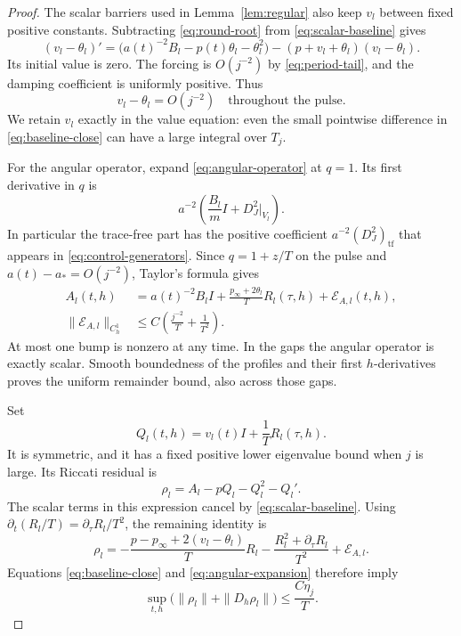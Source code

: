 \begin{proof}
The scalar barriers used in Lemma~\ref{lem:regular} also keep \(v_l\)
between fixed positive constants.  Subtracting
\eqref{eq:round-root} from \eqref{eq:scalar-baseline} gives
\[
 (v_l-\theta_l)'=
 \bigl(a(t)^{-2}B_l-p(t)\theta_l-\theta_l^2\bigr)
 -(p+v_l+\theta_l)(v_l-\theta_l).
\]
Its initial value is zero.  The forcing is \(O(j^{-2})\) by
\eqref{eq:period-tail}, and the damping coefficient is uniformly
positive.  Thus
\begin{equation}
 v_l-\theta_l=O(j^{-2})
 \quad\text{throughout the pulse}.
 \label{eq:baseline-close}
\end{equation}
We retain \(v_l\) exactly in the value equation: even the small
pointwise difference in \eqref{eq:baseline-close} can have a large
integral over \(T_j\).

For the angular operator, expand \eqref{eq:angular-operator} at
\(q=1\).  Its first derivative in \(q\) is
\[
 a^{-2}\left(\frac{B_l}{m}I+D_J^2|_{V_l}\right).
\]
In particular the trace-free part has the positive coefficient
\(a^{-2}(D_J^2)_{\mathrm{tf}}\) that appears in
\eqref{eq:control-generators}.  Since \(q=1+z/T\) on the pulse and
\(a(t)-a_*=O(j^{-2})\), Taylor's formula gives
\begin{equation}
 \begin{aligned}
 A_l(t,h)
 &=a(t)^{-2}B_lI+\frac{p_\infty+2\theta_l}{T}R_l(\tau,h)
       +\mathcal E_{A,l}(t,h),\\
 \|\mathcal E_{A,l}\|_{C^1_h}
 &\leq C\left(\frac{j^{-2}}{T}+\frac1{T^2}\right).
 \end{aligned}
 \label{eq:angular-expansion}
\end{equation}
At most one bump is nonzero at any time.  In the gaps the angular
operator is exactly scalar.  Smooth boundedness of the profiles
and their first \(h\)-derivatives proves the uniform remainder
bound, also across those gaps.

Set
\[
 Q_l(t,h)=v_l(t)I+\frac1T R_l(\tau,h).
\]
It is symmetric, and it has a fixed positive lower eigenvalue
bound when \(j\) is large.  Its Riccati residual is
\[
 \rho_l=A_l-pQ_l-Q_l^2-Q_l'.
\]
The scalar terms in this expression cancel by
\eqref{eq:scalar-baseline}.  Using
\(\partial_t(R_l/T)=\partial_\tau R_l/T^2\), the remaining
identity is
\[
 \rho_l
 =-\frac{p-p_\infty+2(v_l-\theta_l)}{T}R_l
   -\frac{R_l^2+\partial_\tau R_l}{T^2}
   +\mathcal E_{A,l}.
\]
Equations \eqref{eq:baseline-close} and
\eqref{eq:angular-expansion} therefore imply
\begin{equation}
 \sup_{t,h}
 \bigl(\|\rho_l\|+\|D_h\rho_l\|\bigr)
 \leq\frac{C\eta_j}{T}.
 \label{eq:residual}
\end{equation}


\end{proof}
